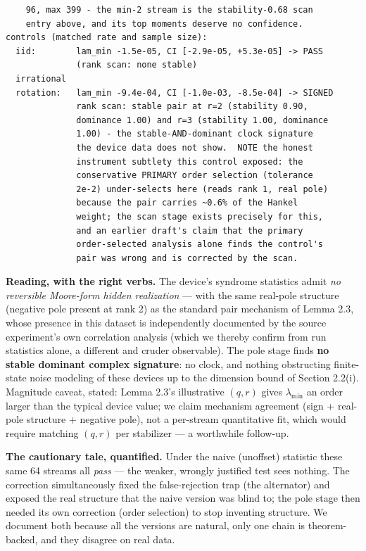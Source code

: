 \documentclass[11pt]{article}
\begin{document}
\begin{small}
\begin{verbatim}
    96, max 399 - the min-2 stream is the stability-0.68 scan
    entry above, and its top moments deserve no confidence.
controls (matched rate and sample size):
  iid:        lam_min -1.5e-05, CI [-2.9e-05, +5.3e-05] -> PASS
              (rank scan: none stable)
  irrational
  rotation:   lam_min -9.4e-04, CI [-1.0e-03, -8.5e-04] -> SIGNED
              rank scan: stable pair at r=2 (stability 0.90,
              dominance 1.00) and r=3 (stability 1.00, dominance
              1.00) - the stable-AND-dominant clock signature
              the device data does not show.  NOTE the honest
              instrument subtlety this control exposed: the
              conservative PRIMARY order selection (tolerance
              2e-2) under-selects here (reads rank 1, real pole)
              because the pair carries ~0.6% of the Hankel
              weight; the scan stage exists precisely for this,
              and an earlier draft's claim that the primary
              order-selected analysis alone finds the control's
              pair was wrong and is corrected by the scan.
\end{verbatim}\end{small}
\textbf{Reading, with the right verbs.}  The device's syndrome statistics admit \emph{no reversible Moore-form hidden realization} — with the same real-pole structure (negative pole present at rank 2) as the standard pair mechanism of Lemma 2.3, whose presence in this dataset is independently documented by the source experiment's own correlation analysis (which we thereby confirm from run statistics alone, a different and cruder observable).  The pole stage finds \textbf{no stable dominant complex signature}: no clock, and nothing obstructing finite-state noise modeling of these devices up to the dimension bound of Section 2.2(i).  Magnitude caveat, stated: Lemma 2.3's illustrative $(q, r)$ gives $\lambda_{\min}$ an order larger than the typical device value; we claim mechanism agreement (sign + real-pole structure + negative pole), not a per-stream quantitative fit, which would require matching $(q, r)$ per stabilizer — a worthwhile follow-up.

\textbf{The cautionary tale, quantified.}  Under the naive (unoffset) statistic these same 64 streams all \emph{pass} — the weaker, wrongly justified test sees nothing.  The correction simultaneously fixed the false-rejection trap (the alternator) and exposed the real structure that the naive version was blind to; the pole stage then needed its own correction (order selection) to stop inventing structure.  We document both because all the versions are natural, only one chain is theorem-backed, and they disagree on real data.
\end{document}

